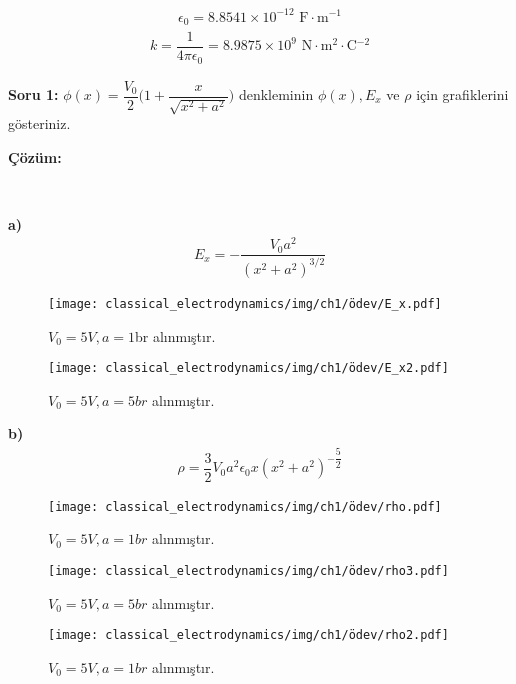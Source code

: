    \begin{flushleft}
   \begin{align*}
       \epsilon_{0} = 8.8541 \times 10^{-12} \textrm{ F$\cdot$m$^{-1}$}
   \end{align*}
   \begin{align*}
       k = \dfrac{1}{4 \pi \epsilon_{0}} = 8.9875 \times 10^{9} \textrm{ N$\cdot$m$^{2}$$\cdot$C$^{-2}$}
       \end{align*}
   
	\textbf{Soru 1:} $ \phi (x) = \dfrac{V_{0}}{2} \Big( 1 + \dfrac{x}{\sqrt{x^{2}+a^{2}}} \Big) $ \textrm{denkleminin} $\phi(x), E_{x}$ ve $\rho$ için grafiklerini gösteriniz.

	
\end{flushleft}
   
	\textbf{Çözüm:} 

\ 

 \textbf{a)}
 \begin{align}
     E_{x} = - \dfrac{V_{0}a^{2}}{(x^{2} + a^{2} )^{3/2}}
 \end{align}
 \begin{figure}[h]
 \centering
\texttt{[image: classical\_electrodynamics/img/ch1/ödev/E\_x.pdf]}
\caption*{$V_{0} = 5V, a=1$br alınmıştır.}
	\end{figure}
 \begin{figure}[h!]
 \centering
\texttt{[image: classical\_electrodynamics/img/ch1/ödev/E\_x2.pdf]}
\caption*{$V_{0} = 5V, a=5br$ alınmıştır.}
	\end{figure}
\newpage 

 \textbf{b)}
 \begin{align}
     \rho = \dfrac{3}{2}V_{0} a^{2} \epsilon_{0} x (x^{2}+a^{2})^{-\dfrac{5}{2}}
 \end{align}
 \begin{figure}[h]
 \centering
\texttt{[image: classical\_electrodynamics/img/ch1/ödev/rho.pdf]}
\caption*{$V_{0} = 5V, a=1br$ alınmıştır.}
\end{figure}	
\begin{figure}[h]
 \centering
\texttt{[image: classical\_electrodynamics/img/ch1/ödev/rho3.pdf]}
\caption*{$V_{0} = 5V, a=5br$ alınmıştır.}
\end{figure}
  \begin{figure}[h!]
 \centering
\texttt{[image: classical\_electrodynamics/img/ch1/ödev/rho2.pdf]}
\caption*{$V_{0} = 5V, a=1br$ alınmıştır.}
	\end{figure}

